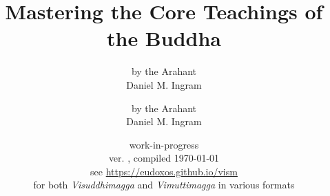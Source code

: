 

\def\vismAssertFootnoteCounter#1{\relax}

	\title{Mastering the Core Teachings of the Buddha}
	\date{work-in-progress \\ ver. \vismCommitHref, compiled \today \\ see \url{https://eudoxos.github.io/vism}  \\ for both \emph{Visuddhimagga} and \emph{Vimuttimagga} in various formats}
	\ifplastex
		\author{by the Arahant \\ Daniel M. Ingram}
	\else
		\author{by the Arahant \\ Daniel M. Ingram}
	\fi
	\maketitle

	\frontmatter
		\renewcommand{\thechapter}{\arabic{chapter}}

		\bgroup
			\ifplastex\else\renewcommand{\baselinestretch}{0.2}\normalsize\fi
			\tableofcontents
		\egroup
		

